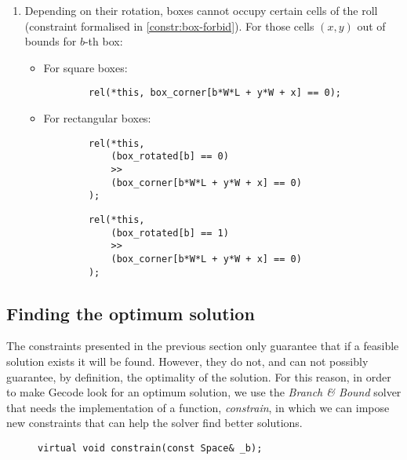 \begin{enumerate}
    \item Depending on their rotation, boxes cannot occupy certain cells of the
    roll (constraint formalised in \ref{constr:box-forbid}). For those cells $(x,y)$
    out of bounds for $b$-th box:
    
    \begin{itemize}
		\item For square boxes:
		{\NOINDENT \begin{lstlisting}
		rel(*this, box_corner[b*W*L + y*W + x] == 0);
		\end{lstlisting}}
		
		\item For rectangular boxes:
		{\NOINDENT \begin{lstlisting}
		rel(*this,
			(box_rotated[b] == 0)
			>>
			(box_corner[b*W*L + y*W + x] == 0)
		);
		\end{lstlisting}}
		{\NOINDENT \begin{lstlisting}
		rel(*this,
			(box_rotated[b] == 1)
			>>
			(box_corner[b*W*L + y*W + x] == 0)
		);
		\end{lstlisting}}
	\end{itemize}
    
\end{enumerate}

\subsection{Finding the optimum solution}
\label{sec:constraint-programming:optimum}

The constraints presented in the previous section only guarantee that if a feasible solution
exists it will be found. However, they do not, and can not possibly guarantee, by definition,
the optimality of the solution. For this reason, in order to make Gecode look for an optimum
solution, we use the \textit{Branch \& Bound} solver that needs the implementation of a function,
\textit{constrain}, in which we can impose new constraints that can help the solver find
better solutions.

\begin{figure}[H]
	\centering
	{\NOINDENT \begin{lstlisting}[xleftmargin=.24\textwidth]
	virtual void constrain(const Space& _b);
	\end{lstlisting}}
	\label{fig:constrain-header}
\end{figure}

